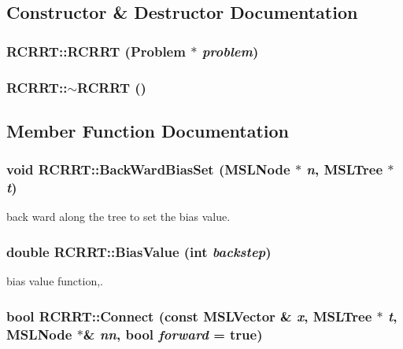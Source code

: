 \subsection{Constructor \& Destructor Documentation}
\subsubsection{\setlength{\rightskip}{0pt plus 5cm}RCRRT::RCRRT ({\bf Problem} $\ast$ {\em problem})}\label{classRCRRT_a4}


\subsubsection{\setlength{\rightskip}{0pt plus 5cm}RCRRT::$\sim$RCRRT ()\hspace{0.3cm}{\tt  [inline, virtual]}}\label{classRCRRT_a5}




\subsection{Member Function Documentation}
\subsubsection{\setlength{\rightskip}{0pt plus 5cm}void RCRRT::Back\-Ward\-Bias\-Set ({\bf MSLNode} $\ast$ {\em n}, {\bf MSLTree} $\ast$ {\em t})\hspace{0.3cm}{\tt  [virtual]}}\label{classRCRRT_a2}


back ward along the tree to set the bias value.

\subsubsection{\setlength{\rightskip}{0pt plus 5cm}double RCRRT::Bias\-Value (int {\em backstep})}\label{classRCRRT_a3}


bias value function,.

\subsubsection{\setlength{\rightskip}{0pt plus 5cm}bool RCRRT::Connect (const {\bf MSLVector} \& {\em x}, {\bf MSLTree} $\ast$ {\em t}, {\bf MSLNode} $\ast$\& {\em nn}, bool {\em forward} = true)\hspace{0.3cm}{\tt  [virtual]}}\label{classRCRRT_a9}


